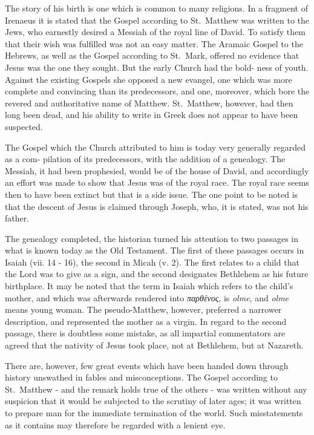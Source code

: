 \documentclass[]{book}
\begin{document}
The story of his birth is one which is common to many religions. In a
fragment of Irenaeus it is stated that the Gospel according to
St.~Matthew was written to the Jews, who earnestly desired a Messiah of
the royal line of David. To satisfy them that their wish was fulfilled
was not an easy matter. The Aramaic Gospel to the Hebrews, as well as
the Gospel according to St.~Mark, offered no evidence that Jesus was the
one they sought. But the early Church had the bold- ness of youth.
Against the existing Gospels she opposed a new evangel, one which was
more complete and convincing than its predecessors, and one, moreover,
which bore the revered and authoritative name of Matthew. St.~Matthew,
however, had then long been dead, and his ability to write in Greek does
not appear to have been suspected.

The Gospel which the Church attributed to him is today very generally
regarded as a com- pilation of its predecessors, with the addition of a
genealogy. The Messiah, it had been prophesied, would be of the house of
David, and accordingly an effort was made to show that Jesus was of the
royal race. The royal race seems then to have been extinct but that is a
side issue. The one point to be noted is that the descent of Jesus is
claimed through Joseph, who, it is stated, was not his father.

The genealogy completed, the historian turned his attention to two
passages in what is known today as the Old Testament. The first of these
passages occurs in Isaiah (vii. 14 - 16), the second in Micah (v. 2).
The first relates to a child that the Lord was to give as a sign, and
the second designates Bethlehem as his future birthplace. It may be
noted that the term in Isaiah which refers to the child's mother, and
which was afterwards rendered into \emph{παρθένος}, is \emph{olme}, and
\emph{olme} means young woman. The pseudo-Matthew, however, preferred a
narrower description, and represented the mother as a virgin. In regard
to the second passage, there is doubtless some mistake, as all impartial
commentators are agreed that the nativity of Jesus took place, not at
Bethlehem, but at Nazareth.

There are, however, few great events which have been handed down through
history unswathed in fables and misconceptions. The Gospel according to
St.~Matthew - and the remark holds true of the others - was written
without any suspicion that it would be subjected to the scrutiny of
later ages; it was written to prepare man for the immediate termination
of the world. Such misstatements as it contains may therefore be
regarded with a lenient eye.
\end{document}
